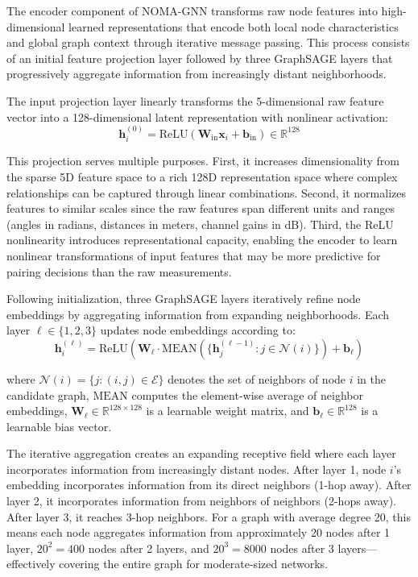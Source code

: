 The encoder component of NOMA-GNN transforms raw node features into high-dimensional learned representations that encode both local node characteristics and global graph context through iterative message passing. This process consists of an initial feature projection layer followed by three GraphSAGE layers that progressively aggregate information from increasingly distant neighborhoods.

The input projection layer linearly transforms the 5-dimensional raw feature vector into a 128-dimensional latent representation with nonlinear activation:
\begin{equation}
\mathbf{h}_i^{(0)} = \text{ReLU}(\mathbf{W}_{\text{in}} \mathbf{x}_i + \mathbf{b}_{\text{in}}) \in \mathbb{R}^{128}
\end{equation}

This projection serves multiple purposes. First, it increases dimensionality from the sparse 5D feature space to a rich 128D representation space where complex relationships can be captured through linear combinations. Second, it normalizes features to similar scales since the raw features span different units and ranges (angles in radians, distances in meters, channel gains in dB). Third, the ReLU nonlinearity introduces representational capacity, enabling the encoder to learn nonlinear transformations of input features that may be more predictive for pairing decisions than the raw measurements.

Following initialization, three GraphSAGE layers iteratively refine node embeddings by aggregating information from expanding neighborhoods. Each layer $\ell \in \{1,2,3\}$ updates node embeddings according to:
\begin{equation}
\mathbf{h}_i^{(\ell)} = \text{ReLU}\left(\mathbf{W}_\ell \cdot \text{MEAN}\left(\{\mathbf{h}_j^{(\ell-1)} : j \in \mathcal{N}(i)\}\right) + \mathbf{b}_\ell\right)
\end{equation}

where $\mathcal{N}(i) = \{j : (i,j) \in \mathcal{E}\}$ denotes the set of neighbors of node $i$ in the candidate graph, $\text{MEAN}$ computes the element-wise average of neighbor embeddings, $\mathbf{W}_\ell \in \mathbb{R}^{128 \times 128}$ is a learnable weight matrix, and $\mathbf{b}_\ell \in \mathbb{R}^{128}$ is a learnable bias vector.

The iterative aggregation creates an expanding receptive field where each layer incorporates information from increasingly distant nodes. After layer 1, node $i$'s embedding incorporates information from its direct neighbors (1-hop away). After layer 2, it incorporates information from neighbors of neighbors (2-hops away). After layer 3, it reaches 3-hop neighbors. For a graph with average degree 20, this means each node aggregates information from approximately 20 nodes after 1 layer, $20^2 = 400$ nodes after 2 layers, and $20^3 = 8000$ nodes after 3 layers—effectively covering the entire graph for moderate-sized networks.

